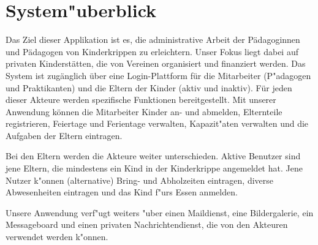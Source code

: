 \section{System"uberblick}
  Das Ziel dieser Applikation ist es, die administrative Arbeit der Pädagoginnen und Pädagogen von Kinderkrippen zu erleichtern. Unser Fokus liegt dabei auf privaten Kinderstätten, die von Vereinen organisiert und
  finanziert werden. Das System ist zugänglich über eine Login-Plattform für die Mitarbeiter (P"adagogen und Praktikanten) und die Eltern der Kinder (aktiv und inaktiv). Für jeden dieser Akteure werden spezifische Funktionen bereitgestellt.
  Mit unserer Anwendung können die Mitarbeiter Kinder an- und abmelden, Elternteile registrieren, Feiertage und Ferientage verwalten, Kapazit"aten verwalten und die Aufgaben der Eltern eintragen.
 
  Bei den Eltern werden die Akteure weiter unterschieden. Aktive Benutzer sind jene Eltern, die mindestens ein Kind in der Kinderkrippe angemeldet hat. Jene Nutzer k"onnen (alternative) Bring- und Abholzeiten eintragen, diverse
  Abwesenheiten eintragen und das Kind f"urs Essen anmelden.
  
  Unsere Anwendung verf"ugt weiters "uber einen Maildienst, eine Bildergalerie, ein Messageboard und einen privaten Nachrichtendienst, die von den Akteuren verwendet werden k"onnen.
  